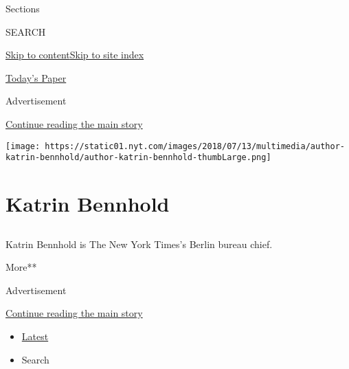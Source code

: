 Sections

SEARCH

\protect\hyperlink{site-content}{Skip to
content}\protect\hyperlink{site-index}{Skip to site index}

\href{https://myaccount.nytimes.com/auth/login?response_type=cookie\&client_id=vi}{}

\href{https://www.nytimes.com/section/todayspaper}{Today's Paper}

Advertisement

\protect\hyperlink{after-top}{Continue reading the main story}

\texttt{[image: https://static01.nyt.com/images/2018/07/13/multimedia/author-katrin-bennhold/author-katrin-bennhold-thumbLarge.png]}

\hypertarget{katrin-bennhold}{%
\section{Katrin Bennhold}\label{katrin-bennhold}}

\subsection{}

Katrin Bennhold is The New York Times's Berlin bureau chief.

More**

Advertisement

\protect\hyperlink{after-mid1}{Continue reading the main story}

\begin{itemize}
\tightlist
\item
  \protect\hyperlink{stream-panel}{Latest}
\item
  Search
\end{itemize}

